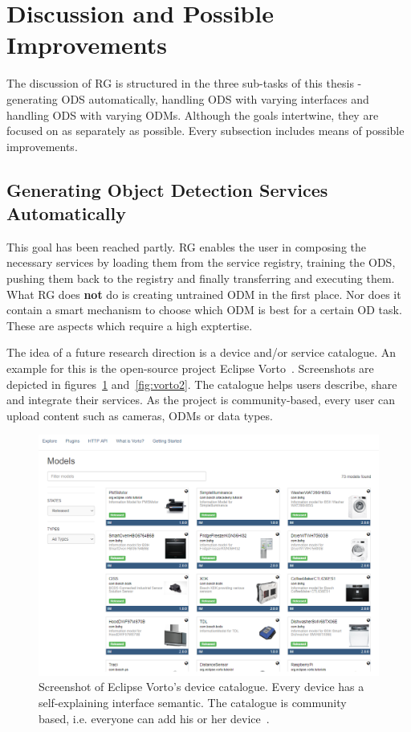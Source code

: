 \section{Discussion and Possible Improvements}
The discussion of RG is structured in the three sub-tasks of this thesis - generating ODS automatically, handling ODS with varying interfaces and handling ODS with varying ODMs. Although the goals intertwine, they are focused on as separately as possible. Every subsection includes means of possible improvements.

\subsection{Generating Object Detection Services Automatically}
This goal has been reached partly. RG enables the user in composing the necessary services by loading them from the service registry, training the ODS, pushing them back to the registry and finally transferring and executing them. What RG does \textbf{not} do is creating untrained ODM in the first place. Nor does it contain a smart mechanism to choose which ODM is best for a certain OD task. These are aspects which require a high exptertise.

The idea of a future research direction is a device and/or service catalogue. An example for this is the open-source project Eclipse Vorto~\cite{Eclipse2019Vorto2019}. Screenshots are depicted in figures~\ref{fig:vorto} and~\ref{fig:vorto2}. The catalogue helps users describe, share and integrate their services. As the project is community-based, every user can upload content such as cameras, ODMs or data types.

\begin{landscape}
\begin{figure}[ht]
    \centering
    \includegraphics[width=1.3\textwidth]{img/EclipseVorto.png}
    \caption[Eclipse Vorto's device catalogue]{Screenshot of Eclipse Vorto's device catalogue. Every device has a self-explaining interface semantic. The catalogue is community based, i.e. everyone can add his or her device~\cite{Eclipse2019Vorto2019}.}
    \label{fig:vorto}
\end{figure}
\end{landscape}


